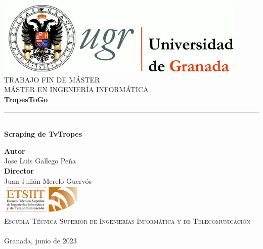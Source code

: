 \begin{titlepage}
\newlength{\centeroffset}
\setlength{\centeroffset}{-0.5\oddsidemargin}
\addtolength{\centeroffset}{0.5\evensidemargin}
\thispagestyle{empty}

\noindent\hspace*{\centeroffset}\begin{minipage}{\textwidth}

\centering
\includegraphics[width=0.9\textwidth]{logos/logo_ugr.jpg}\\[1.4cm]

\textsc{ \Large TRABAJO FIN DE MÁSTER\\[0.2 cm]}
\textsc{ MÁSTER EN INGENIERÍA INFORMÁTICA}\\[1 cm]

{\Huge\bfseries TropesToGo \\}
\noindent\rule[-1ex]{\textwidth}{3pt}\\[3.5 ex]
{\large\bfseries Scraping de TvTropes }
\end{minipage}

\vspace{2.5cm}
\noindent\hspace*{\centeroffset}
\begin{minipage}{\textwidth}
\centering

\textbf{Autor}\\ {Jose Luis Gallego Peña}\\[2.5 ex]
\textbf{Director}\\ {Juan Julián Merelo Guervós}\\[2 cm]
\includegraphics[width=0.3\textwidth]{logos/etsiit_logo.png}\\[0.1 cm]
\textsc{Escuela Técnica Superior de Ingenierías Informática y de Telecomunicación}\\
\textsc{---}\\
Granada, junio de 2023
\end{minipage}
\end{titlepage}
